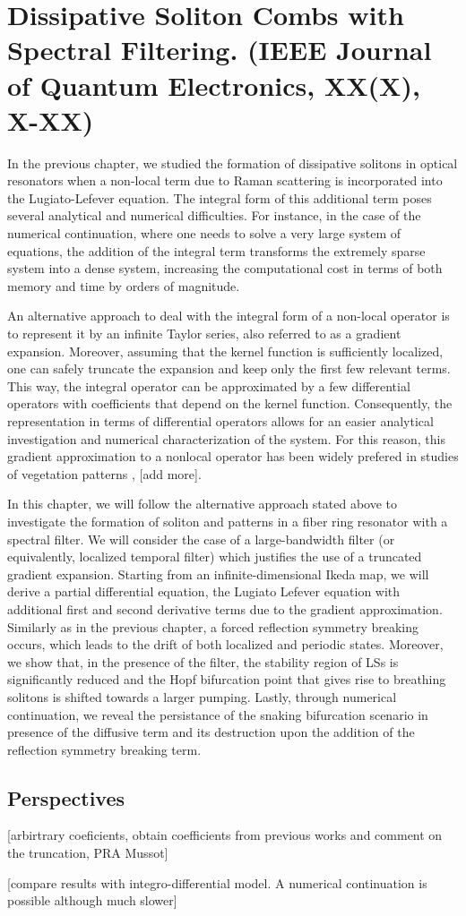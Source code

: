 \chapter{Dissipative Soliton Combs with Spectral Filtering. (IEEE Journal of Quantum Electronics, XX(X), X-XX)}

In the previous chapter, we studied the formation of dissipative solitons in optical
resonators when a non-local
term due to Raman scattering is incorporated into the Lugiato-Lefever equation. The
integral form of this additional term poses several analytical and numerical difficulties.
For instance, in the case of the numerical continuation, where one needs to solve a very
large system of equations, the addition of the integral term transforms the extremely sparse
system into a dense system, increasing the computational cost in terms of both memory and time
by orders of magnitude.

An alternative approach to deal with the integral form of a non-local operator is to represent
it by an infinite Taylor series, also referred to as a gradient expansion. Moreover, 
assuming that the kernel function is sufficiently localized, one can safely truncate the expansion
and keep only the first few relevant terms. This way, the integral operator can be
approximated by a few differential operators with coefficients that depend on
the kernel function. Consequently, the representation in terms of differential operators
allows for an easier analytical investigation and numerical characterization of the system.
For this reason, this gradient approximation to a nonlocal operator has been widely 
prefered in studies of vegetation patterns \cite{lefever1997origin}, [add more].

In this chapter, we will follow the alternative approach stated above to investigate
the formation of soliton and patterns in a fiber ring resonator with a spectral filter. 
We will consider the case of a large-bandwidth filter (or equivalently, localized temporal filter)
which justifies the use of a truncated gradient expansion. Starting from an infinite-dimensional
Ikeda map, we will derive a partial differential equation, the Lugiato Lefever equation with additional
first and second derivative terms due to the gradient approximation. Similarly as in the previous chapter,
a forced reflection symmetry breaking occurs, which leads to the drift of both localized and periodic states.
Moreover, we show that, in the presence of the filter, the stability region of LSs is significantly reduced
and the Hopf bifurcation point that gives rise to breathing solitons is shifted towards a larger pumping.
Lastly, through numerical continuation, we reveal the persistance of the snaking bifurcation scenario in
presence of the diffusive term and its destruction upon the addition of the reflection symmetry breaking term.



\section{Perspectives}

[arbirtrary coeficients, obtain coefficients from previous works and
comment on the truncation, PRA Mussot]

[compare results with integro-differential model. A numerical continuation
is possible although much slower]
